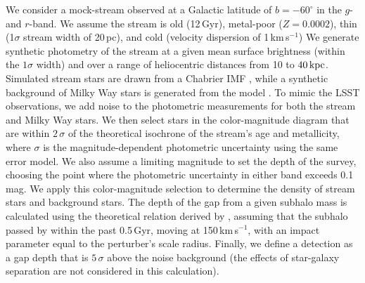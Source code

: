 We consider a mock-stream observed at a Galactic latitude of $b=-60^\circ$ in the $g$- and $r$-band. We assume the stream is old (12\,Gyr), metal-poor ($Z = 0.0002$), thin (1$\sigma$ stream width of 20\,pc), and cold (velocity dispersion of 1\,km\,s$^{-1}$) We generate synthetic photometry of the stream at a given mean surface brightness (within the $1\sigma$ width) and over a range of heliocentric distances from 10 to $40\mathrm{\,kpc}$.  Simulated stream stars are drawn from a Chabrier IMF \citep{2003PASP..115..763C}, while a synthetic background of Milky Way stars is generated from the  model \citep{sharma2011}. To mimic the LSST observations, we add noise to the photometric measurements for both the stream and Milky Way stars. 
We then select stars in the color-magnitude diagram that are within $2\,\sigma$ of the theoretical isochrone of the stream's age and metallicity, where $\sigma$ is the magnitude-dependent photometric uncertainty using the same error model. 
We also assume a limiting magnitude to set the depth of the survey, choosing the point where the photometric uncertainty in either band exceeds 0.1 mag. We apply this color-magnitude selection to determine the density of stream stars and background stars.
The depth of the gap from a given subhalo mass is calculated using the theoretical relation derived by \citet{erkal2016}, assuming that the subhalo passed by within the past 0.5\,Gyr, moving at 150\,km\,s$^{-1}$, with an impact parameter equal to the perturber's scale radius. Finally, we define a detection as a gap depth that is $5\,\sigma$ above the noise background (the effects of star-galaxy separation are not considered in this calculation).

